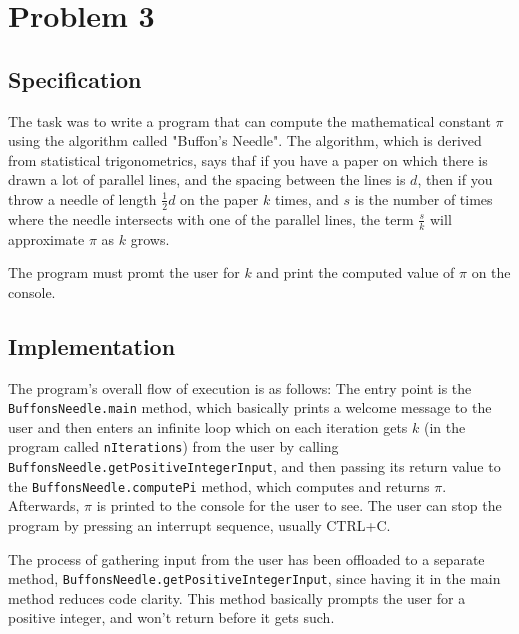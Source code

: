 \documentclass{scrartcl}
\newcommand\code[1]{\texttt{#1}}
\begin{document}
\section*{Problem 3}
\subsection*{Specification}
The task was to write a program that can compute the mathematical 
constant $\pi$ using the algorithm called "Buffon's Needle".
The algorithm, which is derived from statistical trigonometrics, says
thaf if you have a paper on which there is drawn a lot of parallel
lines, and the spacing between the lines is $d$, then if you throw
a needle of length $\frac{1}{2}d$ on the paper $k$ times, and $s$
is the number of times where the needle intersects with one
of the parallel lines, the term $\frac{s}{k}$ will approximate $\pi$  
as $k$ grows.

The program must promt the user for $k$ and print the computed
value of $\pi$  on the console.

\subsection*{Implementation}
The program's overall flow of execution is as follows:
The entry point is the \code{BuffonsNeedle.main} method, which
basically prints a welcome message to the user and then enters an
infinite loop which on each iteration gets $k$ (in the program
called \code{nIterations}) from the user by calling
\code{BuffonsNeedle.getPositiveIntegerInput}, and then passing
its return value to the \code{BuffonsNeedle.computePi} method, which
computes and returns $\pi$.  Afterwards, $\pi$  is printed to the
console for the user to see. The user can stop the program by pressing
an interrupt sequence, usually CTRL+C.

The process of gathering input from the user has been offloaded to a
separate method, \code{BuffonsNeedle.getPositiveIntegerInput}, since
having it in the main method reduces code clarity. This method
basically prompts the user for a positive integer, and won't return
before it gets such.
\end{document}

